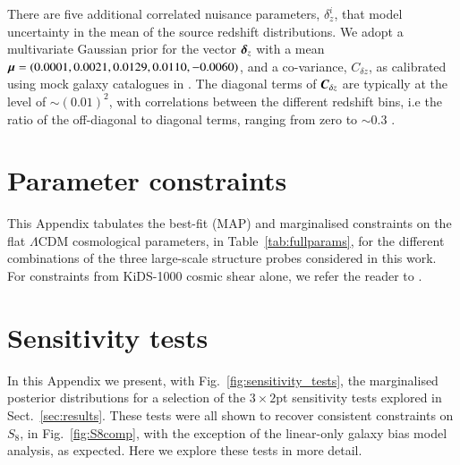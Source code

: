 \begin{appendix}
There are five additional correlated nuisance parameters, $\delta^i_z$, that model uncertainty in the mean of the source redshift distributions.  We adopt a multivariate Gaussian prior for the vector $\mbox{\boldmath $\delta$}_z$ with a mean $\mbox{\boldmath $\mu$} = (0.0001,0.0021,0.0129,0.0110,-0.0060)$, and a co-variance, $C_{\delta z}$, as calibrated using mock galaxy catalogues in \citet{wright/etal:2020}.   The diagonal terms of $\mbox{\boldmath $C$}_{\delta z}$ are typically at the level of $\sim(0.01)^2$, with correlations between the different redshift bins, i.e the ratio of the off-diagonal to diagonal terms,  ranging from zero to $\sim 0.3$ \citep[see section 3.3 of][for details]{joachimi/etal:inprep}.


\section{Parameter constraints}
\label{app:parameter-constraints}
This Appendix tabulates the best-fit (MAP) and marginalised constraints on the flat $\Lambda$CDM cosmological parameters, in Table~\ref{tab:fullparams}, for the different combinations of the three large-scale structure probes considered in this work.   For constraints from KiDS-1000 cosmic shear alone, we refer the reader to \citet{asgari/etal:inprep}.


\section{Sensitivity tests}
\label{app:sensitivity}
In this Appendix we present, with Fig.~\ref{fig:sensitivity_tests}, the marginalised posterior distributions for a selection of the $3\times2$pt sensitivity tests explored in Sect.~\ref{sec:results}.  These tests were all shown to recover consistent constraints on $S_8$, in Fig.~\ref{fig:S8comp}, with the exception of the linear-only galaxy bias model analysis, as expected.    Here we explore these tests in more detail.    


\end{appendix}
